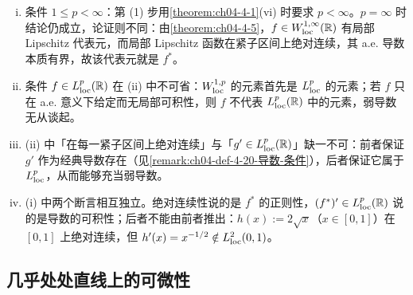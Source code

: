 ﻿\documentclass[../../main.tex]{subfiles}%
\begin{document}
\begin{remark}\label{remark:ch04-thm-4-20-条件}
\begin{enumerate}[(i)]
\item 条件 $1\leqslant p<\infty$：第 (1) 步用\cref{theorem:ch04-4-1}(vi) 时要求 $p<\infty$。$p=\infty$ 时结论仍成立，论证则不同：由\cref{theorem:ch04-4-5}，$f\in W^{1,\infty}_{\mathrm{loc}}(\mathbb{R})$ 有局部 Lipschitz 代表元，而局部 Lipschitz 函数在紧子区间上绝对连续，其 a.e. 导数本质有界，故该代表元就是 $f^{*}$。%
\item 条件 $f\in L^{p}_{\mathrm{loc}}(\mathbb{R})$ 在 (ii) 中不可省：$W^{1,p}_{\mathrm{loc}}$ 的元素首先是 $L^{p}_{\mathrm{loc}}$ 的元素；若 $f$ 只在 a.e. 意义下给定而无局部可积性，则 $f$ 不代表 $L^{p}_{\mathrm{loc}}(\mathbb{R})$ 中的元素，弱导数无从谈起。
\item (ii) 中「在每一紧子区间上绝对连续」与「$g'\in L^{p}_{\mathrm{loc}}(\mathbb{R})$」缺一不可：前者保证 $g'$ 作为经典导数存在（见\cref{remark:ch04-def-4-20-导数-条件}），后者保证它属于 $L^{p}_{\mathrm{loc}}$，从而能够充当弱导数。%
\item (i) 中两个断言相互独立。绝对连续性说的是 $f^{*}$ 的正则性，$(f^{*})'\in L^{p}_{\mathrm{loc}}(\mathbb{R})$ 说的是导数的可积性；后者不能由前者推出：$h(x):=2\sqrt{x}$（$x\in[0,1]$）在 $[0,1]$ 上绝对连续，但 $h'(x)=x^{-1/2}\notin L^{2}_{\mathrm{loc}}(0,1)$。
\end{enumerate}
\end{remark}

\subsection{几乎处处直线上的可微性}\label{subsection:ch04-09-2}
\end{document}
